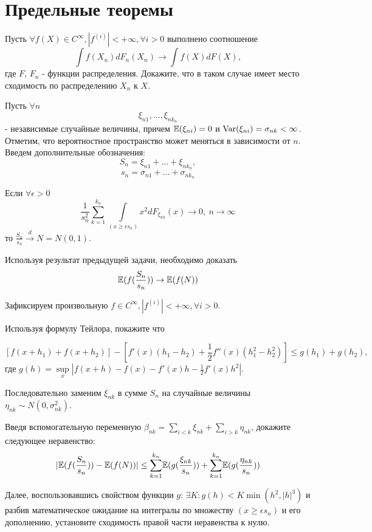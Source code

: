 \section{Предельные теоремы}

\begin{problem}
Пусть $\forall f(X) \in C^{\infty}, |f^{(i)}| < + \infty, \forall i > 0$ выполнено соотношение 
 \[
 \int f(X_n) dF_n(X_n) \rightarrow \int f(X) dF(X),
 \]
\noindent где $F$, $F_n$ - функции распределения. Докажите, что в таком случае имеет место сходимость по распределению  $X_n$ к $X$.
 
\end{problem}

\begin{problem}
Пусть $\forall n$  
\[
\xi_{n1}, \ldots , \xi_{nk_n}
\]
- независимые случайные величины, причем  $\mathrm{{\mathbb E}}(\xi_{ni}) = 0$ и $\mathop{\mathrm{Var}}\nolimits(\xi_{ni}) = \sigma_{nk} < \infty$. Отметим, что вероятностное пространство может меняться в зависимости от $n$. Введем дополнительные обозначения: 
 \[
 S_n = \xi_{n1} + \ldots + \xi_{nk_n},
 \]
 \[
 s_n = \sigma_{n1} + \ldots + \sigma_{nk_n}
 \]
  
  Если $\forall \epsilon > 0$ 
  \[
  \frac{1}{s_n^2} \underset{k=1}{\overset{k_n}{\sum}} \underset{(x \geq \epsilon s_n)}{\int} x^2 dF_{\xi_{nk}}(x) \rightarrow 0, \: n \rightarrow \infty
  \]  
  \noindent то $\frac{S_n}{s_n} \overset{d}{\longrightarrow} N = N(0, 1)$.
\end{problem}

\begin{ordre}
Используя результат предыдущей задачи, необходимо доказать 
\[
\mathrm{{\mathbb E}}(f(\frac{S_n}{s_n})) \rightarrow \mathrm{{\mathbb E}}(f(N)) 
\] 

Зафиксируем произвольную $f \in C^{\infty}, |f^{(i)}| < + \infty, \forall i > 0$.

Используя формулу Тейлора, покажите что

\[
[f(x + h_1) + f(x+h_2)]  - [f'(x)(h_1 - h_2) + \frac{1}{2} f''(x)(h_1^2 - h_2^2)] \leq g(h_1) + g(h_2),
\]  
\noindent где $g(h) = \underset{x}{\sup}| f(x+h) - f(x) - f'(x)h - \frac{1}{2} f'(x)h^2|$.

Последовательно заменим $\xi_{nk}$ в сумме $S_n$ на случайные величины $\eta_{nk} \sim N(0, \sigma_{nk}^2)$.

Введя вспомогательную переменную $\beta_{nk} = \underset{i<k}{\sum}\xi_{nk} + \underset{i>k}{\sum}\eta_{nk}$, докажите следующее неравенство:
\[
|\mathrm{{\mathbb E}}(f(\frac{S_n}{s_n})) - \mathrm{{\mathbb E}}(f(N))| \leq \underset{k=1}{\overset{k_n}{\sum}} \mathrm{{\mathbb E}} (g(\frac{\xi_{nk}}{s_n})) + \underset{k=1}{\overset{k_n}{\sum}} \mathrm{{\mathbb E}} (g(\frac{\eta_{nk}}{s_n}))
\] 

Далее, воспользовавшись свойством функции $g$: $\exists K: g(h) < K \min(h^2, |h|^3)$ и разбив математическое ожидание на интегралы по множеству  $(x \geq \epsilon s_n)$ и его дополнению, установите сходимость правой части неравенства к нулю.  

\end{ordre} 

